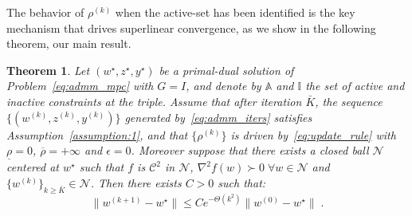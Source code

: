\documentclass[letterpaper, 10 pt, conference]{ieeeconf}  %
\newtheorem{theorem}{Theorem}
\begin{document}
The behavior of $\rho^{(k)}$ when the active-set has been identified is the key mechanism that drives superlinear convergence, as we show in the following theorem, our main result.
\begin{theorem}
\label{thm:superlinear_convergence}
Let $(w^{\star}, z^{\star}, y^{\star})$ be a primal-dual solution of Problem~\eqref{eq:admm_mpc} with $G = I$, and denote by $\mathbb{A}$ and $\mathbb{I}$ the set of active and inactive constraints at the triple. Assume that after iteration $\bar{K}$, the sequence $\{(w^{(k)}, z^{(k)}, y^{(k)})\}$ generated by~\eqref{eq:admm_iters} satisfies Assumption~\ref{assumption:1}, and that $\{\rho^{(k)}\}$ is driven by~\eqref{eq:update_rule} with $\underline{\rho} = 0$, $\overline{\rho} = + \infty$ and $\epsilon=0$. Moreover suppose that there exists a closed ball $\mathcal{N}$ centered at $w^{\star}$ such that $f$ is $\mathcal{C}^2$ in $\mathcal{N}$, $\nabla^2 f(w) \succ 0 \; \forall w \in \mathcal{N}$ and $\{w^{(k)}\}_{k\geq\bar{K}} \in \mathcal{N}$. 
Then there exists $C > 0$ such that:
\begin{equation}
    \|w^{(k+1)} - w^{\star} \| \leq C e^{-\Theta(k^2)} \|w^{(0)} - w^{\star}\| \;.
\end{equation}
\end{theorem}
\end{document}
